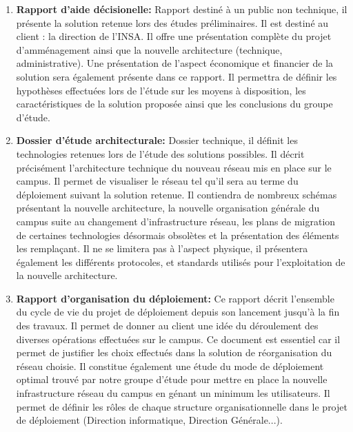 \begin{enumerate}
\item \textbf{Rapport d'aide décisionelle:} Rapport destiné à un public non technique, il présente la solution retenue lors  des études préliminaires. Il est destiné au client : la direction de l'INSA. Il offre une présentation complète du projet d'amménagement ainsi que la nouvelle architecture (technique, administrative). Une présentation de l'aspect économique et financier de la solution sera également présente dans ce rapport. Il permettra de définir les hypothèses effectuées lors de l'étude sur les moyens à disposition, les caractéristiques de la solution proposée ainsi que les conclusions du groupe d'étude.\\

\item \textbf{Dossier d'étude architecturale:} Dossier technique, il définit les technologies retenues lors de l'étude des solutions possibles. Il décrit précisément l'architecture technique du nouveau réseau mis en place sur le campus. Il permet de visualiser le réseau tel qu'il sera au terme du déploiement suivant la solution retenue. Il contiendra de nombreux schémas présentant la nouvelle architecture, la nouvelle organisation générale du campus suite au changement d'infrastructure réseau, les plans de migration de certaines technologies désormais obsolètes et la présentation des éléments les remplaçant. Il ne se limitera pas à l'aspect physique, il présentera également les différents protocoles, et standards utilisés pour l'exploitation de la nouvelle architecture.\\

\item \textbf{Rapport d'organisation du déploiement:} Ce rapport décrit l'ensemble du cycle de vie du projet de déploiement depuis son lancement jusqu'à la fin des travaux. Il permet de donner au client  une idée du déroulement des diverses opérations effectuées sur le campus. Ce document est essentiel car il permet de justifier les choix effectués dans la solution de réorganisation du réseau choisie. Il constitue également une étude du mode de déploiement optimal trouvé par notre groupe d'étude pour mettre en place la nouvelle infrastructure réseau du campus en génant un minimum les utilisateurs. Il permet de définir les rôles de chaque structure organisationnelle dans le projet de déploiement (Direction informatique, Direction Générale...).\\


\end{enumerate}
